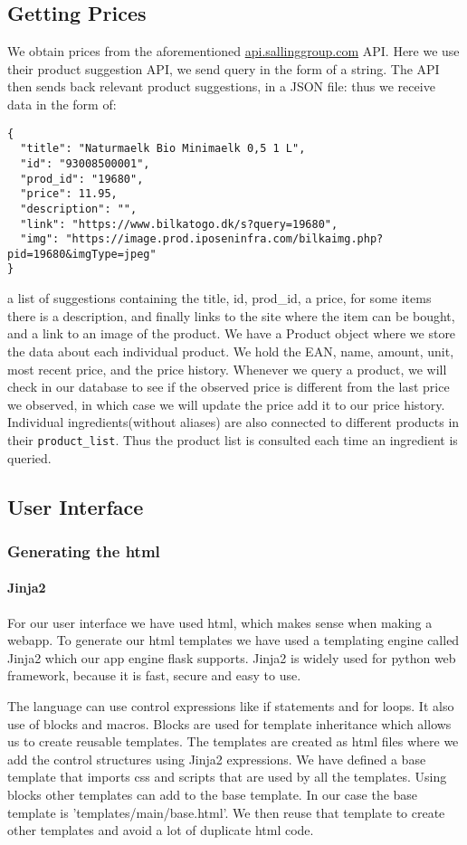 \documentclass{article}
\begin{document}
\subsection{Getting Prices}
We obtain prices from the aforementioned \url{api.sallinggroup.com} API. Here we use their
product suggestion API, we send query in the form of a string. The API then sends back
relevant product suggestions, in a JSON file: thus we receive data in the form of:
\begin{lstlisting}[basicstyle=\normalsize\ttfamily]
{
  "title": "Naturmaelk Bio Minimaelk 0,5 1 L",
  "id": "93008500001",
  "prod_id": "19680",
  "price": 11.95,
  "description": "",
  "link": "https://www.bilkatogo.dk/s?query=19680",
  "img": "https://image.prod.iposeninfra.com/bilkaimg.php?pid=19680&imgType=jpeg"
}
\end{lstlisting}
a list of suggestions containing the title, id, prod\_id, a price, for some items there is
a description, and finally links to the site where the item can be bought, and a link to
an image of the product. We have a Product object where we store the data about each
individual product. We hold the EAN, name, amount, unit, most recent price, and the price
history. Whenever we query a product, we will check in our database to see if the observed
price is different from the last price we observed, in which case we will update the price
add it to our price history. Individual ingredients(without aliases) are also connected to
different products in their \texttt{product\_list}. Thus the product list is consulted 
each time an ingredient is queried.


\subsection{User Interface}
\subsubsection{Generating the html}
\paragraph{Jinja2}
For our user interface we have used html, which makes sense when making a
webapp. To generate our html templates we have used a templating engine called
Jinja2 which our app engine flask supports. Jinja2 is widely used for python
web framework, because it is fast, secure and easy to use.

The language can use control expressions like if statements and for loops. It
also use of blocks and macros. Blocks are used for template inheritance which
allows us to create reusable templates. The templates are created as html files
where we add the control structures using Jinja2 expressions. We have defined
a base template that imports css and scripts that are used by all the templates.
Using blocks other templates can add to the base template. In our case the base
template is 'templates/main/base.html'. We then reuse that template to create
other templates and avoid a lot of duplicate html code.
\end{document}
